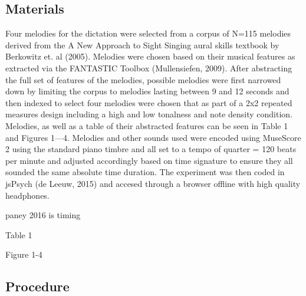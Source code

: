 \documentclass[]{book}
\begin{document}
\hypertarget{materials-1}{%
\subsection{Materials}\label{materials-1}}

Four melodies for the dictation were selected from a corpus of N=115 melodies derived from the A New Approach to Sight Singing aural skills textbook by Berkowitz et. al (2005).
Melodies were chosen based on their musical features as extracted via the FANTASTIC Toolbox (Mullensiefen, 2009).
After abstracting the full set of features of the melodies, possible melodies were first narrowed down by limiting the corpus to melodies lasting between 9 and 12 seconds and then indexed to select four melodies were chosen that as part of a 2x2 repeated measures design including a high and low tonalness and note density condition.
Melodies, as well as a table of their abstracted features can be seen in Table 1 and Figures 1---4.
Melodies and other sounds used were encoded using MuseScore 2 using the standard piano timbre and all set to a tempo of quarter = 120 beats per minute and adjusted accordingly based on time signature to ensure they all sounded the same absolute time duration.
The experiment was then coded in jsPsych (de Leeuw, 2015) and accesed through a browser offline with high quality headphones.

paney 2016 is timing

Table 1

Figure 1-4

\hypertarget{procedure-1}{%
\subsection{Procedure}\label{procedure-1}}
\end{document}
